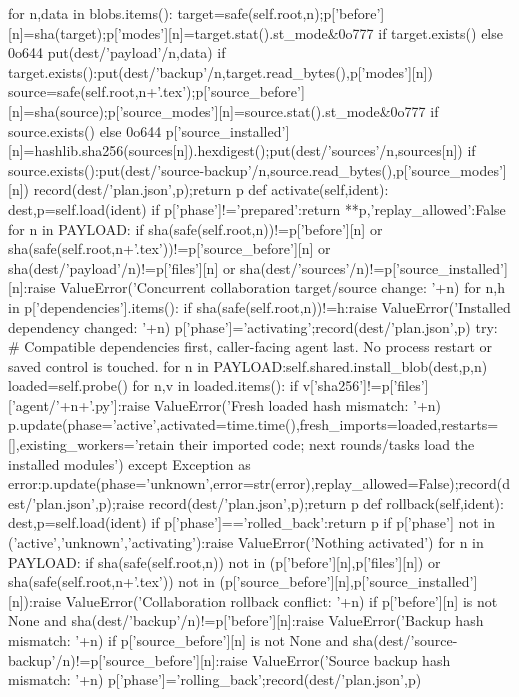   for n,data in blobs.items():
   target=safe(self.root,n);p['before'][n]=sha(target);p['modes'][n]=target.stat().st_mode&0o777 if target.exists() else 0o644
   put(dest/'payload'/n,data)
   if target.exists():put(dest/'backup'/n,target.read_bytes(),p['modes'][n])
   source=safe(self.root,n+'.tex');p['source_before'][n]=sha(source);p['source_modes'][n]=source.stat().st_mode&0o777 if source.exists() else 0o644
   p['source_installed'][n]=hashlib.sha256(sources[n]).hexdigest();put(dest/'sources'/n,sources[n])
   if source.exists():put(dest/'source-backup'/n,source.read_bytes(),p['source_modes'][n])
  record(dest/'plan.json',p);return p
 def activate(self,ident):
  dest,p=self.load(ident)
  if p['phase']!='prepared':return {**p,'replay_allowed':False}
  for n in PAYLOAD:
   if sha(safe(self.root,n))!=p['before'][n] or sha(safe(self.root,n+'.tex'))!=p['source_before'][n] or sha(dest/'payload'/n)!=p['files'][n] or sha(dest/'sources'/n)!=p['source_installed'][n]:raise ValueError('Concurrent collaboration target/source change: '+n)
  for n,h in p['dependencies'].items():
   if sha(safe(self.root,n))!=h:raise ValueError('Installed dependency changed: '+n)
  p['phase']='activating';record(dest/'plan.json',p)
  try:
   # Compatible dependencies first, caller-facing agent last. No process restart or saved control is touched.
   for n in PAYLOAD:self.shared.install_blob(dest,p,n)
   loaded=self.probe()
   for n,v in loaded.items():
    if v['sha256']!=p['files']['agent/'+n+'.py']:raise ValueError('Fresh loaded hash mismatch: '+n)
   p.update(phase='active',activated=time.time(),fresh_imports=loaded,restarts=[],existing_workers='retain their imported code; next rounds/tasks load the installed modules')
  except Exception as error:p.update(phase='unknown',error=str(error),replay_allowed=False);record(dest/'plan.json',p);raise
  record(dest/'plan.json',p);return p
 def rollback(self,ident):
  dest,p=self.load(ident)
  if p['phase']=='rolled_back':return p
  if p['phase'] not in ('active','unknown','activating'):raise ValueError('Nothing activated')
  for n in PAYLOAD:
   if sha(safe(self.root,n)) not in (p['before'][n],p['files'][n]) or sha(safe(self.root,n+'.tex')) not in (p['source_before'][n],p['source_installed'][n]):raise ValueError('Collaboration rollback conflict: '+n)
   if p['before'][n] is not None and sha(dest/'backup'/n)!=p['before'][n]:raise ValueError('Backup hash mismatch: '+n)
   if p['source_before'][n] is not None and sha(dest/'source-backup'/n)!=p['source_before'][n]:raise ValueError('Source backup hash mismatch: '+n)
  p['phase']='rolling_back';record(dest/'plan.json',p)

